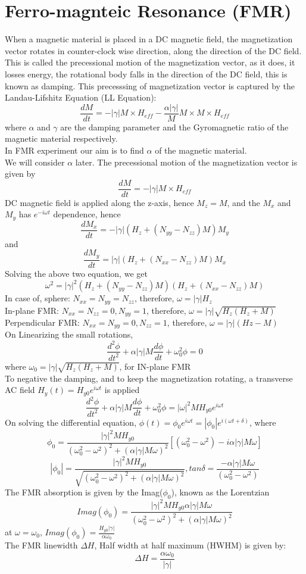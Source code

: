 \section{Ferro-magnteic Resonance (FMR)}
When a magnetic material is placed in a DC magnetic field, the magnetization vector rotates in counter-clock wise direction, along the direction of the DC field. This is called the precessional motion of the magnetization vector, as it does, it losses energy, the rotational body falls in the direction of the DC field, this is known as damping. This precesssing of magnetization vector is captured by the   Landau-Lifshitz Equation (LL Equation):
\[\frac{dM}{dt}=-|\gamma|M\times H_{eff} - \frac{\alpha |\gamma|}{M}M\times M\times H_{eff}\]
where $\alpha$ and $\gamma$ are the damping parameter and the Gyromagnetic ratio of the magnetic material respectively.\\
In FMR experiment our aim is to find $\alpha$ of the magnetic material.\\
We will consider $\alpha$ later. The precessional motion of the magnetization vector is given by 
\[\frac{dM}{dt}=-|\gamma|M\times H_{eff}\]
DC magnetic field is applied along the z-axis, hence $M_z=M$, and the $M_x$ and $M_y$ has $e^{-i\omega t}$ dependence, hence
\[\frac{dM_x}{dt}=-|\gamma|(H_z + (N_{yy}-N_{zz})M)M_y\]
and
\[\frac{dM_y}{dt}=|\gamma|(H_z + (N_{xx}-N_{zz})M)M_x\]
Solving the above two equation, we get
\[\omega^2=|\gamma|^2(H_z + (N_{yy}-N_{zz})M)(H_z+(N_{xx}-N_{zz})M)\]
In case of, sphere: $N_{xx}=N_{yy}=N_{zz}$, therefore, $\omega =|\gamma|H_z$\\
In-plane FMR: $N_{xx}=N_{zz}=0, N_{yy}=1$, therefore, $\omega =|\gamma|\sqrt{H_z(H_z+M)}$\\
Perpendicular FMR:  $N_{xx}=N_{yy}=0, N_{zz}=1$, therefore, $\omega =|\gamma|(Hz-M)$\\
On Linearizing the small rotations,
\[\frac{d^2\phi}{dt^2}+\alpha|\gamma|M\frac{d\phi}{dt}+\omega_0^2\phi=0\]
where $\omega_0=|\gamma|\sqrt{H_z(H_z+M)}$, for IN-plane FMR\\
To negative the damping, and to keep the magnetization rotating, a transverse AC field $H_y(t)=H_{y0}e^{i\omega t}$ is applied
\[\frac{d^2\phi}{dt^2}+\alpha|\gamma|M\frac{d\phi}{dt}+\omega_0^2\phi =|\omega|^2MH_{y0}e^{i\omega t} \]
On solving the differential equation, $\phi(t)=\phi_0e^{i\omega t}=|\phi_0|e^{i(\omega t+\delta)}$, where\\
\[\phi_0=\frac{|\gamma|^2MH_{y0}}{(\omega_0^2 - \omega^2)^2 + (\alpha|\gamma|M\omega)^2}[(\omega_0^2 - \omega^2)-i\alpha|\gamma|M\omega]\]
\[|\phi_0|=\frac{|\gamma|^2MH_{y0}}{\sqrt{(\omega_0^2 - \omega^2)^2 + (\alpha|\gamma|M\omega)^2}}, tan \delta = \frac{-\alpha|\gamma|M\omega}{(\omega_0^2 - \omega^2)}\]
The FMR absorption is given by the Imag($\phi_0$), known as the Lorentzian
\[Imag(\phi_0)=\frac{|\gamma|^2MH_{y0}\alpha|\gamma|M\omega}{(\omega_0^2 - \omega^2)^2 + (\alpha|\gamma|M\omega)^2}\]
at $\omega=\omega_0$, $Imag(\phi_0)=\frac {H_{y0}|\gamma|}{\alpha \omega_0}$\\
The FMR linewidth $\Delta H$, Half width at half maximum (HWHM) is given by:
\[\Delta H =\frac{\alpha\omega_0}{|\gamma|}\]
